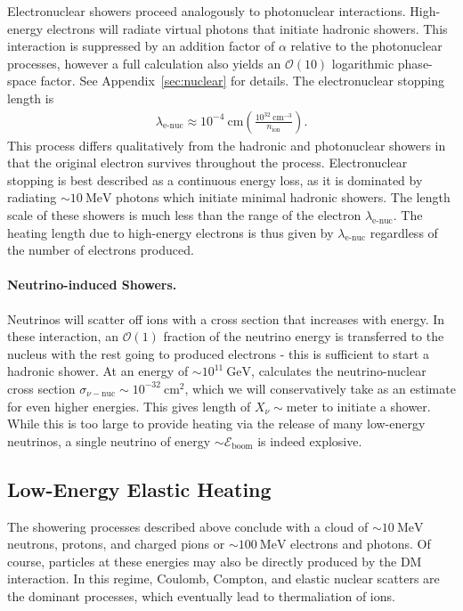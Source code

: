 \documentclass[twocolumn, preprintnumbers,amsmath,amssymb,prd, superscriptaddress]{revtex4}
\newcommand{\Eboom}{\mathcal{E}_\text{boom}}
\newcommand{\OO}{\mathcal{O}}
\newcommand{\GeV}{\text{GeV}}
\newcommand{\MeV}{\text{MeV}}
\newcommand{\cm}{\text{cm}}
\def\r{\right)}
\def\l{\left(}
\begin{document}
Electronuclear showers proceed analogously to photonuclear interactions. 
High-energy electrons will radiate virtual photons that initiate hadronic showers. 
This interaction is suppressed by an addition factor of $\alpha$ relative to the photonuclear processes, however a full calculation also yields an $\OO(10)$ logarithmic phase-space factor.  
See Appendix~\ref{sec:nuclear} for details. 
The electronuclear stopping length is 
\begin{align}
\label{eq:electronuclength}
  \lambda_\text{e-nuc}
  \approx 10^{-4} ~\text{cm} \l\frac{10^{32}~\text{cm}^{-3}}{n_\text{ion}}\r.
\end{align}
This process differs qualitatively from the hadronic and photonuclear showers in that the original electron survives throughout the process. 
Electronuclear stopping is best described as a continuous energy loss, as it is dominated by radiating $\sim 10~\MeV$ photons which initiate minimal hadronic showers. 
The length scale of these showers is much less than the range of the electron $\lambda_\text{e-nuc}$.
The heating length due to high-energy electrons is thus given by $\lambda_\text{e-nuc}$ regardless of the number of electrons produced. 

\paragraph{Neutrino-induced Showers.}
Neutrinos will scatter off ions with a cross section that increases with energy.
In these interaction, an $\OO(1)$ fraction of the neutrino energy is transferred to the nucleus with the rest going to produced electrons \cite{Formaggio:2013kya} - this is sufficient to start a hadronic shower.
At an energy of $\sim 10^{11} ~\GeV$, \cite{Formaggio:2013kya} calculates the neutrino-nuclear cross section $\sigma_{\nu-\text{nuc}} \sim 10^{-32} ~\cm^2$, which we will conservatively take as an estimate for even higher energies.
This gives length of $X_\nu \sim \text{meter}$ to initiate a shower.
While this is too large to provide heating via the release of many low-energy neutrinos, a single neutrino of energy $\sim \Eboom$ is indeed explosive.


\subsection{Low-Energy Elastic Heating}

The showering processes described above conclude with a cloud of $\sim 10~\MeV$ neutrons, protons, and charged pions or $\sim 100~\MeV$ electrons and photons. 
Of course, particles at these energies may also be directly produced by the DM interaction.
In this regime, Coulomb, Compton, and elastic nuclear scatters are the dominant processes, which eventually lead to thermaliation of ions.
\end{document}
